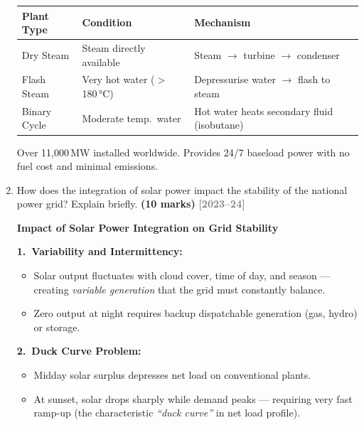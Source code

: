 \documentclass[12pt,a3paper]{article}
\newcommand{\yr}[1]{\hfill\textcolor{gray}{\small\textbf{[#1]}}}
\newcommand{\mk}[1]{\textcolor{orange!70!black}{\small\textbf{(#1 marks)}}}
\begin{document}
\begin{enumerate}
\begin{tcolorbox}[enhanced,breakable,ansbox,colback=cA!4,colframe=cA,
  boxrule=0.8pt,arc=5pt,
  title={\textbf{Answer}},fonttitle=\bfseries\color{white},colbacktitle=cA]
\begin{center}
\small
\begin{tabular}{@{}lll@{}}
\toprule
\textbf{Plant Type} & \textbf{Condition} & \textbf{Mechanism} \\
\midrule
Dry Steam     & Steam directly available   & Steam $\to$ turbine $\to$ condenser \\
Flash Steam   & Very hot water ($>$180\,°C) & Depressurise water $\to$ flash to steam \\
Binary Cycle  & Moderate temp.\ water      & Hot water heats secondary fluid (isobutane) \\
\bottomrule
\end{tabular}
\end{center}

Over 11,000\,MW installed worldwide. Provides 24/7 baseload power with no fuel cost and minimal emissions.

\end{tcolorbox}

\item \label{qlabel:A1-Q2}
How does the integration of solar power impact the stability of the national power grid? Explain briefly. \mk{10}
\yr{2023--24}

\begin{tcolorbox}[enhanced,breakable,ansbox,colback=cA!4,colframe=cA,
  boxrule=0.8pt,arc=5pt,
  title={\textbf{Answer}},fonttitle=\bfseries\color{white},colbacktitle=cA]

\textbf{Impact of Solar Power Integration on Grid Stability}

\textbf{1.\ Variability and Intermittency:}
\begin{itemize}[leftmargin=1.5em,itemsep=2pt]
  \item Solar output fluctuates with cloud cover, time of day, and season — creating \emph{variable generation} that the grid must constantly balance.
  \item Zero output at night requires backup dispatchable generation (gas, hydro) or storage.
\end{itemize}

\textbf{2.\ Duck Curve Problem:}
\begin{itemize}[leftmargin=1.5em,itemsep=2pt]
  \item Midday solar surplus depresses net load on conventional plants.
  \item At sunset, solar drops sharply while demand peaks — requiring very fast ramp-up (the characteristic \emph{``duck curve''} in net load profile).
\end{itemize}


\end{tcolorbox}
\end{enumerate}
\end{document}
